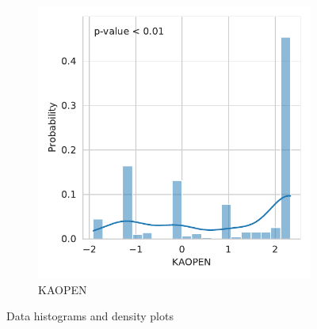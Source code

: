 \documentclass[12pt,a4paper]{article}
\begin{document}
\begin{figure}[htbp]\ContinuedFloat
\centering
\begin{subfigure}{0.45\textwidth}
\includegraphics[width=\textwidth]{./plots/dis/distplot_KAOPEN.pdf}
\caption{KAOPEN}
\end{subfigure}
\caption[]{Data histograms and density plots}
\end{figure}

\FloatBarrier
\end{document}
